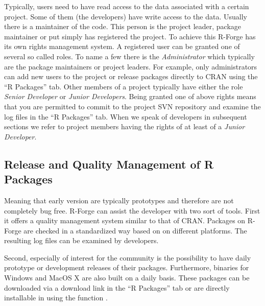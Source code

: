 
Typically, users need to have read access to the data associated with
a certain project. Some of them (the developers) have write access to
the data. Usually there is a maintainer of the code. This person is the project
leader, package maintainer or put simply has registered the
project. 
To achieve this R-Forge has its own rights management system. A
registered user can be 
granted one of several so called roles. To name a few there is
the \textit{Administrator} which typically are the package
maintainers or project leaders. For example, only  administrators can
add new users 
to the project or release packages directly to CRAN using the ``R Packages''
tab. Other members of a project typically have either the role \textit{Senior
Developer} or \textit{Junior Developers}. Being granted one of above
rights means that you are permitted to commit to the project
SVN repository and examine the log files in the ``R Packages'' tab.
When we speak of developers in subsequent sections we refer to project
members having the rights of at least of a \textit{Junior Developer}.


\subsection{Release and Quality Management of R Packages}

Meaning that early version are typically prototypes and therefore are
not completely bug free. R-Forge can assist the developer with two
sort of tools. First it offers a quality management system similar to
that of CRAN. Packages on R-Forge are checked in a
standardized way based on  on different
platforms. The resulting log files can be examined by developers.

Second, especially of interest for the \R{} community is the
possibility to have daily prototype or development releases
of their packages. Furthermore, binaries for Windows and MacOS X are
also built on a daily basis. These packages can be
downloaded via a download link in the ``R Packages'' tab or
are directly installable in \R{} using the function . 

